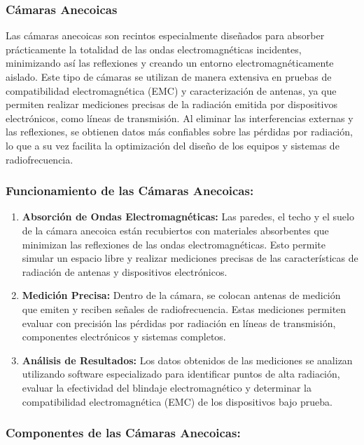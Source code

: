         \subsubsection{Cámaras Anecoicas}

            Las cámaras anecoicas son recintos especialmente diseñados para absorber prácticamente la totalidad de las ondas electromagnéticas incidentes, minimizando así las reflexiones y creando un entorno electromagnéticamente aislado. Este tipo de cámaras se utilizan de manera extensiva en pruebas de compatibilidad electromagnética (EMC) y caracterización de antenas, ya que permiten realizar mediciones precisas de la radiación emitida por dispositivos electrónicos, como líneas de transmisión. Al eliminar las interferencias externas y las reflexiones, se obtienen datos más confiables sobre las pérdidas por radiación, lo que a su vez facilita la optimización del diseño de los equipos y sistemas de radiofrecuencia.

        \subsubsection*{Funcionamiento de las Cámaras Anecoicas:}
            
            \begin{enumerate}
                \item \textbf{Absorción de Ondas Electromagnéticas:} Las paredes, el techo y el suelo de la cámara anecoica están recubiertos con materiales absorbentes que minimizan las reflexiones de las ondas electromagnéticas. Esto permite simular un espacio libre y realizar mediciones precisas de las características de radiación de antenas y dispositivos electrónicos.
                \item \textbf{Medición Precisa:} Dentro de la cámara, se colocan antenas de medición que emiten y reciben señales de radiofrecuencia. Estas mediciones permiten evaluar con precisión las pérdidas por radiación en líneas de transmisión, componentes electrónicos y sistemas completos.
                \item \textbf{Análisis de Resultados:} Los datos obtenidos de las mediciones se analizan utilizando software especializado para identificar puntos de alta radiación, evaluar la efectividad del blindaje electromagnético y determinar la compatibilidad electromagnética (EMC) de los dispositivos bajo prueba.
            \end{enumerate}

        \subsubsection*{Componentes de las Cámaras Anecoicas:}
            
